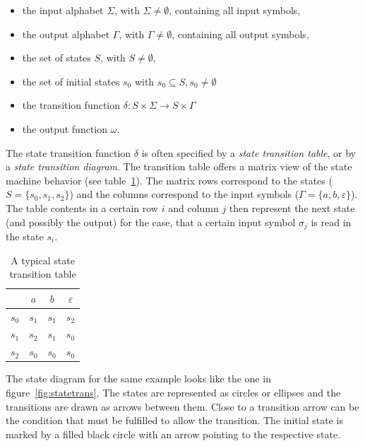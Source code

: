 \documentclass[a4paper,12pt,BCOR6mm,bibtotoc,idxtotoc]{scrbook}
\begin{document}
\begin{itemize}
\item the input alphabet $\Sigma$, with $\Sigma \neq
  \emptyset$, containing all input symbols,
\item the output alphabet $\Gamma$, with $\Gamma \neq
  \emptyset$, containing all output symbols,
\item the set of states $S$, with $S \neq \emptyset$,
\item the set of initial states $s_0$ with $s_0 \subseteq S, s_0 \neq
  \emptyset$
\item the transition function $\delta: S \times \Sigma \rightarrow S
  \times \Gamma$
\item the output function $\omega$.
\end{itemize}

The state transition function $\delta$ is often specified by a
\textit{state transition table}, or by a \textit{state transition
  diagram}. The transition table offers a matrix view of the state
machine behavior (see table~\ref{tab:statetrans}). The matrix rows
correspond to the states ($S = \{s_0, s_1, s_2\}$) and the columns
correspond to the input symbols ($\Gamma = \{a, b, \varepsilon\}$).
The table contents in a certain row $i$ and column $j$ then represent
the next state (and possibly the output) for the case, that a certain
input symbol $\sigma_j$ is read in the state $s_i$.

\begin{table}[htbp]
  \caption{A typical state transition table}
  \label{tab:statetrans}
  \vspace{2mm}
  \centering
  \begin{tabular}{l|ccc}
    & $a$ & $b$ & $\varepsilon$\\ \hline
    $s_0$ & $s_1$ & $s_1$ & $s_2$\\
    $s_1$ & $s_2$ & $s_1$ & $s_0$\\
    $s_2$ & $s_0$ & $s_0$ & $s_0$\\ \hline
  \end{tabular}
\end{table}

The state diagram for the same example looks like the one in
figure~\ref{fig:statetrans}. The states are represented as circles or
ellipses and the transitions are drawn as arrows between them. Close
to a transition arrow can be the condition that must be fulfilled to
allow the transition. The initial state is marked by a filled black
circle with an arrow pointing to the respective state.
\end{document}
